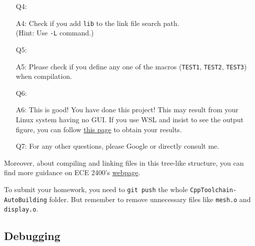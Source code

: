 \documentclass[english]{../TexTemplate/thesis}
\begin{document}
\begin{enumerate}
	\item [Q4:] 
	\item [A4:] Check if you add \verb'lib' to the link file search path.\\
	(Hint: Use \verb'-L' command.)

	\item [Q5:]
	\item [A5:] Please check if you define any one of the macros (\verb'TEST1', \verb'TEST2', \verb'TEST3') when compilation.

	\item [Q6:]
	\item [A6:] This is good! You have done this project! This may result from your Linux system having no GUI. If you use WSL and insist to see the output figure, you can follow \href{https://virtualizationreview.com/articles/2017/02/08/graphical-programs-on-windows-subsystem-on-linux.aspx}{this page} to obtain your results.

	\item [Q7:] For any other questions, please Google or directly consult me.
\end{enumerate}

Moreover, about compiling and linking files in this tree-like structure, you can find more guidance on ECE 2400's \href{https://cornell-ece2400.github.io/ece2400-docs/ece2400-sec2-c-basics/}{webpage}.

\bigskip
To submit your homework, you need to \verb'git push' the whole \verb'CppToolchain-AutoBuilding' folder.
But remember to remove unnecessary files like \verb'mesh.o' and \verb'display.o'.

\newpage
\subsection{Debugging}
\end{document}
